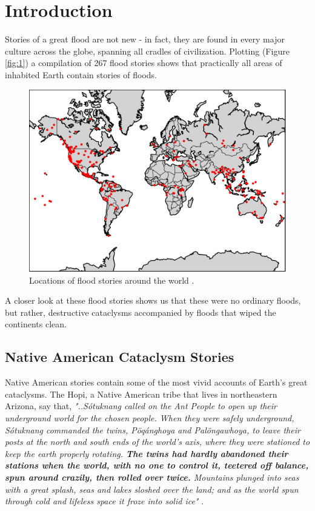 \documentclass[10pt,twocolumn,letterpaper]{article}
\begin{document}
\section{Introduction}

Stories of a great flood are not new - in fact, they are found in every major culture across the globe, spanning all cradles of civilization. Plotting (Figure \ref{fig:1}) a compilation of 267 flood stories \cite{3} shows that practically all areas of inhabited Earth contain stories of floods.

\begin{figure}[h]
\begin{center}
   \includegraphics[width=1\linewidth]{b.png}
\end{center}
   \caption{Locations of flood stories around the world \cite{3}.}
\label{fig:1}
\label{fig:onecol}
\end{figure}

A closer look at these flood stories shows us that these were no ordinary floods, but rather, destructive cataclysms accompanied by floods that wiped the continents clean.

\subsection{Native American Cataclysm Stories}

Native American stories contain some of the most vivid accounts of Earth's great cataclysms. The Hopi, a Native American tribe that lives in northeastern Arizona, say that, \textit{"..Sótuknang called on the Ant People to open up their underground world for the chosen people. When they were safely underground, Sótuknang commanded the twins, Pöqánghoya and Palöngawhoya, to leave their posts at the north and south ends of the world’s axis, where they were stationed to keep the earth properly rotating. \textbf{The twins had hardly abandoned their stations when the world, with no one to control it, teetered off balance, spun around crazily, then rolled over twice.} Mountains plunged into seas with a great splash, seas and lakes sloshed over the land; and as the world spun through cold and lifeless space it froze into solid ice"} \cite{4}.
\end{document}

